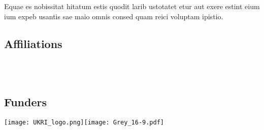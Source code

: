 \documentclass[
]{ImperialPoster}
\begin{document}
\begin{multicols}{3}
	Equae es nobissitat hitatum estis quodit larib ustotatet etur aut exere estint eium ium expeb usantis sae maio omnis consed quam reici voluptam ipistio.

	\subsection{Affiliations}

	\\
	\\

	\subsection{Funders}

	\texttt{[image: UKRI\_logo.png]}\hfill\texttt{[image: Grey\_16-9.pdf]} %


\end{multicols}


\newpage

\titlesection{} %
\end{document}
